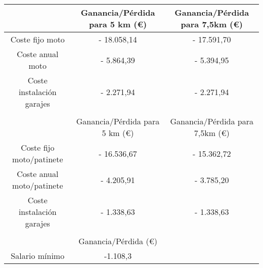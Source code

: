 \begin{table}[H]
\centering
\begin{tabular}{ccc}
\hline
\multicolumn{1}{|c|}{}                          & \multicolumn{1}{c|}{Ganancia/Pérdida para 5 km (€)} & \multicolumn{1}{c|}{Ganancia/Pérdida para 7,5km (€)} \\ \hline
\multicolumn{1}{|c|}{Coste fijo moto}           & \multicolumn{1}{c|}{- 18.058,14}                    & \multicolumn{1}{c|}{- 17.591,70}                     \\ \hline
\multicolumn{1}{|c|}{Coste anual moto}          & \multicolumn{1}{c|}{- 5.864,39}                     & \multicolumn{1}{c|}{- 5.394,95}                      \\ \hline
\multicolumn{1}{|c|}{Coste instalación garajes} & \multicolumn{1}{c|}{- 2.271,94}                     & \multicolumn{1}{c|}{- 2.271,94}                      \\ \hline
\multicolumn{1}{l}{}                            & \multicolumn{1}{l}{}                                & \multicolumn{1}{l}{}                                 \\ \hline
\multicolumn{1}{|c|}{}                          & \multicolumn{1}{c|}{Ganancia/Pérdida para 5 km (€)} & \multicolumn{1}{c|}{Ganancia/Pérdida para 7,5km (€)} \\ \hline
\multicolumn{1}{|c|}{Coste fijo moto/patinete}  & \multicolumn{1}{c|}{- 16.536,67}                    & \multicolumn{1}{c|}{- 15.362,72}                     \\ \hline
\multicolumn{1}{|c|}{Coste anual moto/patinete} & \multicolumn{1}{c|}{- 4.205,91}                     & \multicolumn{1}{c|}{- 3.785,20}                      \\ \hline
\multicolumn{1}{|c|}{Coste instalación garajes} & \multicolumn{1}{c|}{- 1.338,63}                     & \multicolumn{1}{c|}{- 1.338,63}                      \\ \hline
\multicolumn{1}{l}{}                            & \multicolumn{1}{l}{}                                & \multicolumn{1}{l}{}                                 \\ \cline{1-2}
\multicolumn{1}{|c|}{}                          & \multicolumn{1}{c|}{Ganancia/Pérdida (€)}           &                                                      \\ \cline{1-2}
\multicolumn{1}{|c|}{Salario mínimo}            & \multicolumn{1}{c|}{-1.108,3}                       &                                                      \\ \cline{1-2}

\end{tabular}
\end{table}
